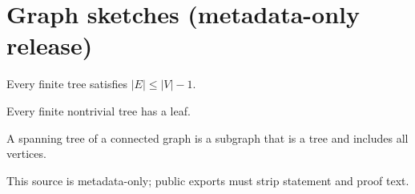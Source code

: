 
\section{Graph sketches (metadata-only release)}

\begin{theorem}
Every finite tree satisfies $|E| \le |V| - 1$.
\end{theorem}

\begin{lemma}
Every finite nontrivial tree has a leaf.
\end{lemma}

\begin{definition}
A spanning tree of a connected graph is a subgraph that is a tree and includes all vertices.
\end{definition}

\begin{remark}
This source is metadata-only; public exports must strip statement and proof text.
\end{remark}

